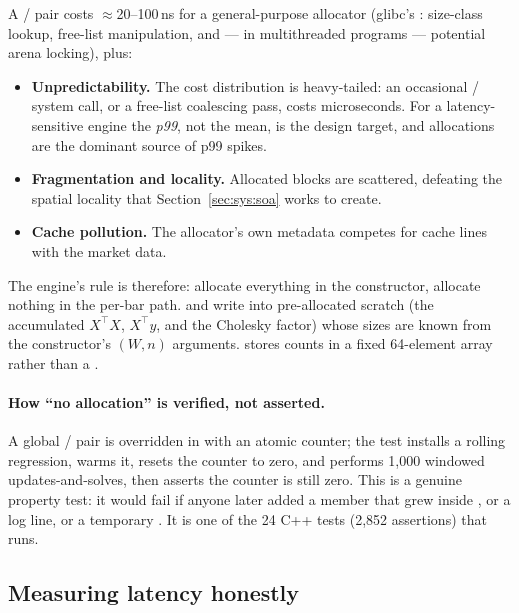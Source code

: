 A / pair costs $\approx$20--100\,ns for a general-purpose
allocator (glibc's : size-class lookup, free-list manipulation, and --- in
multithreaded programs --- potential arena locking), plus:
\begin{itemize}
  \item \textbf{Unpredictability.} The cost distribution is heavy-tailed: an occasional
    / system call, or a free-list coalescing pass, costs microseconds.
    For a latency-sensitive engine the \emph{p99}, not the mean, is the design target, and
    allocations are the dominant source of p99 spikes.
  \item \textbf{Fragmentation and locality.} Allocated blocks are scattered, defeating the
    spatial locality that Section~\ref{sec:sys:soa} works to create.
  \item \textbf{Cache pollution.} The allocator's own metadata competes for cache lines
    with the market data.
\end{itemize}

The engine's rule is therefore: allocate everything in the constructor, allocate nothing
in the per-bar path.  and  write into
pre-allocated scratch (the accumulated $X^{\top}X$, $X^{\top}y$, and the Cholesky factor)
whose sizes are known from the constructor's $(W,n)$ arguments.  stores
counts in a fixed 64-element array rather than a .

\paragraph{How ``no allocation'' is verified, not asserted.} A global
/ pair is overridden in
 with an atomic counter; the test installs a rolling
regression, warms it, resets the counter to zero, and performs 1{,}000 windowed
updates-and-solves, then asserts the counter is still zero. This is a genuine property
test: it would fail if anyone later added a  member that grew inside
, or a  log line, or a temporary
. It is one of the 24 C++ tests (2{,}852 assertions) that
 runs.

\subsection{Measuring latency honestly}
\label{sec:sys:measurement}


